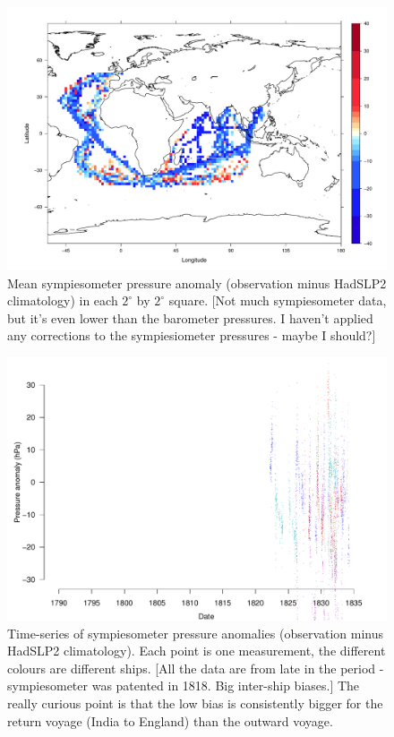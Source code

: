\documentclass[a4paper,11pt]{article}
\begin{document}
\clearpage

\begin{figure}
\begin{center}
\includegraphics[angle=0, width=1.0\textwidth]{../sympiesometer/pre_anomaly_map}
\caption{Mean sympiesometer pressure anomaly (observation minus HadSLP2 climatology) in each $2^\circ$ by $2^\circ$ square. [Not much sympiesometer data, but it's even lower than the barometer pressures. I haven't applied any corrections to the sympiesiometer pressures - maybe I should?]}
\label{sym_pressure_anomaly}
\end{center}
\end{figure}

\begin{figure}
\begin{center}
\includegraphics[angle=0, width=1.0\textwidth]{../sympiesometer/sym_anom_ts}
\caption{Time-series of sympiesometer pressure anomalies (observation minus HadSLP2 climatology). Each point is one measurement, the different colours are different ships. [All the data are from late in the period - sympiesometer was patented in 1818. Big inter-ship biases.] The really curious point is that the low bias is consistently bigger for the return voyage (India to England) than the outward voyage. }
\label{sym_pre_anom_ts}
\end{center}
\end{figure}
\end{document}
